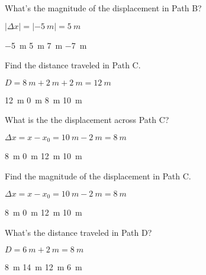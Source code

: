\documentclass[]{exam}
\begin{document}
\begin{questions}
\question
What's the magnitude of the displacement in Path B?

\ifprintanswers
{\color{red} 
$ \left|\Delta x\right| = \left|-\SI{5}{m}\right| = \boxed{\SI{5}{m}}$
}

\smallskip
\fi

\begin{randomizechoices}
    \choice \SI{-5}{m}
    \correctchoice \SI{5}{m}
    \choice \SI{7}{m}
    \choice \SI{-7}{m}
\end{randomizechoices}


\question
Find the distance traveled in Path C.

\ifprintanswers
{\color{red} 
$D = \SI{8}{m} + \SI{2}{m} + \SI{2}{m} = \SI{12}{m}$
}

\smallskip
\fi


\begin{randomizechoices}
    \correctchoice \SI{12}{m}
    \choice \SI{0}{m}
    \choice \SI{8}{m}
    \choice \SI{10}{m}
\end{randomizechoices}


\question
What is the the displacement across Path C?

\ifprintanswers
{\color{red} 
$\Delta x = x - x_0 = \SI{10}{m} - \SI{2}{m} = \boxed{\SI{8}{m}}$
}

\smallskip
\fi


\begin{randomizechoices}
    \correctchoice \SI{8}{m}
    \choice \SI{0}{m}
    \choice \SI{12}{m}
    \choice \SI{10}{m}
\end{randomizechoices}


\question
Find the magnitude of the displacement in Path C.

\ifprintanswers
{\color{red} 
$\Delta x = x - x_0 = \SI{10}{m} - \SI{2}{m} = \boxed{\SI{8}{m}}$
}

\smallskip
\fi


\begin{randomizechoices}
    \correctchoice \SI{8}{m}
    \choice \SI{0}{m}
    \choice \SI{12}{m}
    \choice \SI{10}{m}
\end{randomizechoices}


\question
What's the distance traveled in Path D?

\ifprintanswers
{\color{red} 
$D = \SI{6}{m} + \SI{2}{m} = \SI{8}{m}$
}

\smallskip
\fi


\begin{randomizechoices}
    \correctchoice \SI{8}{m}
    \choice \SI{14}{m}
    \choice \SI{12}{m}
    \choice \SI{6}{m}
\end{randomizechoices}


\end{questions}
\end{document}
